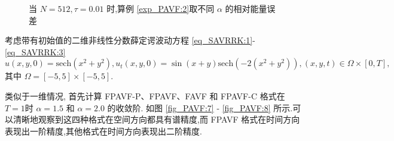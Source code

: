 	\begin{figure}[H]
	\begin{center}
	   
	\caption{当 $N = 512, \tau=0.01$ 时,算例 \ref{exp_PAVF:2}取不同 $\alpha$ 的相对能量误差}\label{fig_PAVF:6}
	\end{center}
	\end{figure}
	\begin{example}\label{exp_PAVF:4}
		考虑带有初始值的二维非线性分数薛定谔波动方程 \eqref{eq_SAVRRK:1}-\eqref{eq_SAVRRK:3}
		\begin{equation}\label{eq_PAVF_110}
		u(x,y, 0)=\mbox{sech}\left(x^2+y^2\right), u_t(x,y, 0)=\sin (x+y) \mbox{sech}\left(-2(x^2+y^2)\right), (x,y,t)\in  \Omega\times[0, T],
		\end{equation}
		其中 $\Omega=[-5,5] \times[-5,5]$.
		\end{example}

	类似于一维情况, 首先计算 FPAVF-P、FPAVF、FAVF 和 FPAVF-C 格式在 $T=1$时 $\alpha=1.5$ 和 $\alpha=2.0$  的收敛阶.
	如图 \ref{fig_PAVF:7} - \ref{fig_PAVF:8} 所示.可以清晰地观察到这四种格式在空间方向都具有谱精度,而 FPAVF 格式在时间方向表现出一阶精度,其他格式在时间方向表现出二阶精度.

